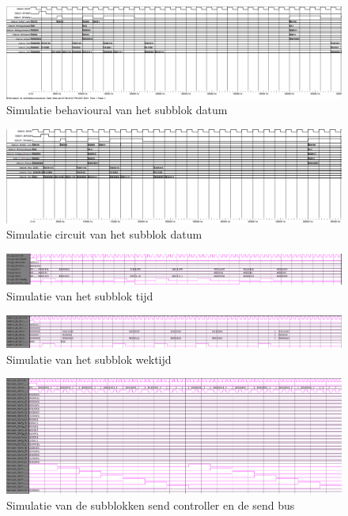 \begin{figure}[h!]
\includegraphics[width=\textwidth,height=\textheight,keepaspectratio]{Figuren/LCD/resultaten/simulatie_datum_behavioural.png}
\caption{Simulatie behavioural van het subblok datum}
\label{fig:sim_datum_behavioural}
\end{figure}

\begin{figure}[h!]
\includegraphics[width=\textwidth,height=\textheight,keepaspectratio]{Figuren/LCD/resultaten/simulatie_datum_circuit.png}
\caption{Simulatie circuit van het subblok datum}
\label{fig:sim_datum_circuit}
\end{figure}

\begin{figure}[h!]
	\includegraphics[width=\textwidth,height=\textheight,keepaspectratio]{Figuren/LCD/resultaten/sim_tijd.png}
	\caption{Simulatie van het subblok tijd}
	\label{fig:sim_tijd}
\end{figure}

\begin{figure}[h!]
	\includegraphics[width=\textwidth,height=\textheight,keepaspectratio]{Figuren/LCD/resultaten/sim_wektijd.png}
	\caption{Simulatie van het subblok wektijd}
	\label{fig:sim_wektijd}
\end{figure}

\begin{figure}[h!]
	\includegraphics[width=\textwidth,height=\textheight,keepaspectratio]{Figuren/LCD/resultaten/sim_send_top.png}
	\caption{Simulatie van de subblokken send controller en de send bus}
	\label{fig:sim_send_top}
\end{figure}
